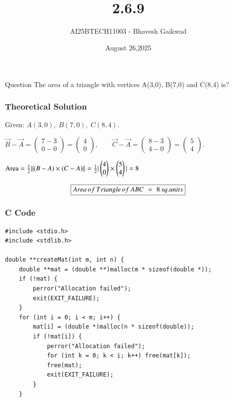 \documentclass{beamer}
\title
{2.6.9}
\date{August 26,2025}
\author 
{AI25BTECH11003 - Bhavesh Gaikwad}
\begin{document}
\frame{\titlepage}
\begin{frame}{Question}
\centering
The area of a triangle with vertices A(3,0), B(7,0) and C(8,4) is?
\end{frame}


\begin{frame}[fragile]
    \frametitle{Theoretical Solution}
Given: $A(3,0),\; B(7,0),\; C(8,4).$

$
\vec{B}-\vec{A}=\begin{pmatrix}7-3\\0-0\end{pmatrix}
=\begin{pmatrix}4\\0\end{pmatrix},\qquad
\vec{C}-\vec{A}=\begin{pmatrix}8-3\\4-0\end{pmatrix}
=\begin{pmatrix}5\\4\end{pmatrix}.
$\\

\bigskip

$
\text{Area}=\frac{1}{2}||(B-A) \times (C-A)|| = \frac{1}{2} |\begin{pmatrix}4 \\ 0\end{pmatrix} \times \begin{pmatrix}5 \\ 4\end{pmatrix}| = 8$

\bigskip

\begin{align}
\centering
    \boxed{ Area \,of \,Triangle \,of \,ABC \,\,= \,\,8 \,sq.units}
\end{align}
\end{frame}


\begin{frame}[fragile]
    \frametitle{C Code}
    \begin{lstlisting}
#include <stdio.h>
#include <stdlib.h>

double **createMat(int m, int n) {
    double **mat = (double **)malloc(m * sizeof(double *));
    if (!mat) {
        perror("Allocation failed");
        exit(EXIT_FAILURE);
    }
    for (int i = 0; i < m; i++) {
        mat[i] = (double *)malloc(n * sizeof(double));
        if (!mat[i]) {
            perror("Allocation failed");
            for (int k = 0; k < i; k++) free(mat[k]);
            free(mat);
            exit(EXIT_FAILURE);
        }
    }


    \end{lstlisting}
\end{frame}
\end{document}
